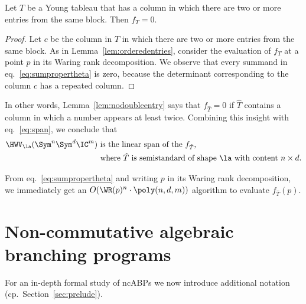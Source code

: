 \begin{lemma}\label{lem:nodoubleentry}
Let $T$ be a Young tableau that has a column in which there are two or more entries from the same block. Then $f_T=0$.
\end{lemma}
\begin{proof}
Let $c$ be the column in $T$ in which there are two or more entries from the same block.
As in Lemma~\ref{lem:orderedentries}, consider the evaluation of $f_T$ at a point $p$ in its Waring rank decomposition. We observe that every summand in eq.~\eqref{eq:sumpropertheta} is zero, because the determinant corresponding to the column $c$ has a repeated column.
\end{proof}

In other words, Lemma~\ref{lem:nodoubleentry} says that $f_{\hat T}=0$ if $\hat T$ contains a column in which a number appears at least twice.
Combining this insight with eq.~\eqref{eq:span}, we conclude that
\begin{equation}\label{eq:spanssyt}
\begin{split}
\HWV_\la(\Sym^n\Sym^d \IC^m) & \text{ is the linear span of the $f_{\hat T}$,} \\
& \text{ where $\hat T$ is semistandard of shape $\la$ with content $n \times d$.}
\end{split}
\end{equation}

\begin{remark}
\label{rem:waringevaluation}
From eq.~\ref{eq:sumpropertheta} and writing $p$ in its Waring rank decomposition, we immediately get an $O(\WR(p)^n \cdot \poly(n,d,m))$ algorithm to evaluate $f_{\hat T}(p)$.
\end{remark}


%
%
%
%
%
%
%
%
%
%
%
%
%
%
%
%
%
%
%
%
%
%
%
%
%
%
%
%
%
%
%
%
%
%
%
%
%
%
%
%
%
%
%
%
%
%
%
%
%
%
%
%
%
%
%
%
%
%
%
%
%
%
%
%
%
%
%
%

%
%
%
%
%
%
%
%

\section{Non-commutative algebraic branching programs}
\label{sec:abp}
For an in-depth formal study of ncABPs we now introduce additional notation (cp.~Section~\ref{sec:prelude}).

